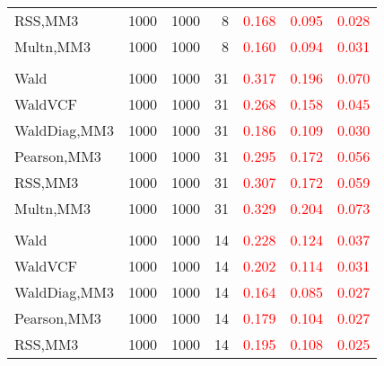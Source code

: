 \documentclass[
]{article}
\begin{document}
\begin{table}[H]
{\begin{tabular}[t]{lrrrrrr}
\hspace{1em}RSS,MM3 & 1000 & 1000 & 8 & \textcolor{red}{0.168} & \textcolor{red}{0.095} & \textcolor{red}{0.028}\\
\hspace{1em}Multn,MM3 & 1000 & 1000 & 8 & \textcolor{red}{0.160} & \textcolor{red}{0.094} & \textcolor{red}{0.031}\\
\addlinespace[0.3em]
\multicolumn{7}{l}{\textbf{1F 15V}}\\
\hspace{1em}Wald & 1000 & 1000 & 31 & \textcolor{red}{0.317} & \textcolor{red}{0.196} & \textcolor{red}{0.070}\\
\hspace{1em}WaldVCF & 1000 & 1000 & 31 & \textcolor{red}{0.268} & \textcolor{red}{0.158} & \textcolor{red}{0.045}\\
\hspace{1em}WaldDiag,MM3 & 1000 & 1000 & 31 & \textcolor{red}{0.186} & \textcolor{red}{0.109} & \textcolor{red}{0.030}\\
\hspace{1em}Pearson,MM3 & 1000 & 1000 & 31 & \textcolor{red}{0.295} & \textcolor{red}{0.172} & \textcolor{red}{0.056}\\
\hspace{1em}RSS,MM3 & 1000 & 1000 & 31 & \textcolor{red}{0.307} & \textcolor{red}{0.172} & \textcolor{red}{0.059}\\
\hspace{1em}Multn,MM3 & 1000 & 1000 & 31 & \textcolor{red}{0.329} & \textcolor{red}{0.204} & \textcolor{red}{0.073}\\
\addlinespace[0.3em]
\multicolumn{7}{l}{\textbf{2F 10V}}\\
\hspace{1em}Wald & 1000 & 1000 & 14 & \textcolor{red}{0.228} & \textcolor{red}{0.124} & \textcolor{red}{0.037}\\
\hspace{1em}WaldVCF & 1000 & 1000 & 14 & \textcolor{red}{0.202} & \textcolor{red}{0.114} & \textcolor{red}{0.031}\\
\hspace{1em}WaldDiag,MM3 & 1000 & 1000 & 14 & \textcolor{red}{0.164} & \textcolor{red}{0.085} & \textcolor{red}{0.027}\\
\hspace{1em}Pearson,MM3 & 1000 & 1000 & 14 & \textcolor{red}{0.179} & \textcolor{red}{0.104} & \textcolor{red}{0.027}\\
\hspace{1em}RSS,MM3 & 1000 & 1000 & 14 & \textcolor{red}{0.195} & \textcolor{red}{0.108} & \textcolor{red}{0.025}\\

\end{tabular}}
\end{table}
\end{document}
